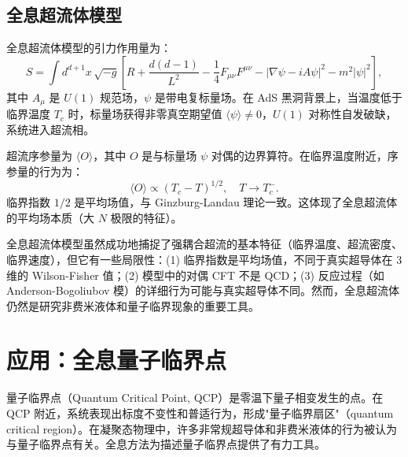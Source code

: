 \subsection{全息超流体模型}

\begin{definition}[全息超流体模型]\label{def:holographic-superfluid}
全息超流体模型的引力作用量为：
\begin{equation}\label{eq:holo-sf-action}
    S = \int d^{d+1}x\,\sqrt{-g}\left[R + \frac{d(d-1)}{L^2} - \frac{1}{4}F_{\mu\nu}F^{\mu\nu} - |\nabla\psi - iA\psi|^2 - m^2|\psi|^2\right],
\end{equation}
其中 $A_\mu$ 是 $U(1)$ 规范场，$\psi$ 是带电复标量场。在 AdS 黑洞背景上，当温度低于临界温度 $T_c$ 时，标量场获得非零真空期望值 $\langle\psi\rangle \neq 0$，$U(1)$ 对称性自发破缺，系统进入超流相。
\end{definition}

\begin{property}[超流序参量与临界行为]\label{prop:superfluid-order}
超流序参量为 $\langle O \rangle$，其中 $O$ 是与标量场 $\psi$ 对偶的边界算符。在临界温度附近，序参量的行为为：
\begin{equation}
    \langle O \rangle \propto (T_c - T)^{1/2}, \quad T \to T_c^-.
\end{equation}
临界指数 $1/2$ 是平均场值，与 Ginzburg-Landau 理论一致。这体现了全息超流体的平均场本质（大 $N$ 极限的特征）。
\end{property}

\begin{remark}[全息超流体的局限与展望]
全息超流体模型虽然成功地捕捉了强耦合超流的基本特征（临界温度、超流密度、临界速度），但它有一些局限性：(1) 临界指数是平均场值，不同于真实超导体在 3 维的 Wilson-Fisher 值；(2) 模型中的对偶 CFT 不是 QCD；(3) 反应过程（如 Anderson-Bogoliubov 模）的详细行为可能与真实超导体不同。然而，全息超流体仍然是研究非费米液体和量子临界现象的重要工具。
\end{remark}


\section{应用：全息量子临界点}

\begin{note}[物理动机]
量子临界点（Quantum Critical Point, QCP）是零温下量子相变发生的点。在 QCP 附近，系统表现出标度不变性和普适行为，形成"量子临界扇区"（quantum critical region）。在凝聚态物理中，许多非常规超导体和非费米液体的行为被认为与量子临界点有关。全息方法为描述量子临界点提供了有力工具。
\end{note}

